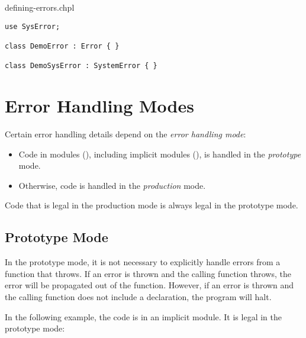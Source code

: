 \begin{chapelexample}{defining-errors.chpl}
\begin{chapel}
\begin{verbatim}
use SysError;

class DemoError : Error { }

class DemoSysError : SystemError { }
\end{verbatim}
\end{chapel}
\end{chapelexample}


\section{Error Handling Modes}
\label{Error_Handling_Modes}

Certain error handling details depend on the \emph{error handling mode}:

\begin{itemize}

\item Code in  modules (),
      including implicit modules (),
      is handled in the \emph{prototype} mode.

\item Otherwise, code is handled in the \emph{production} mode.

\end{itemize}

Code that is legal in the production mode is always legal
in the prototype mode.

\subsection{Prototype Mode}
\label{Errors_Prototype_Mode}

In the prototype mode, it is not necessary to explicitly handle
errors from a function that throws. If an error is thrown and the calling
function throws, the error will be propagated out of the function.  However,
if an error is thrown and the calling function does not include
a  declaration, the program will halt.

In the following example, the code is in an implicit module.
It is legal in the prototype mode:

